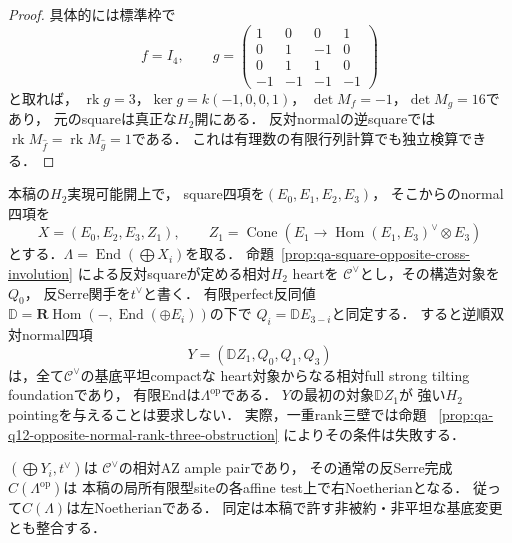 \begin{proof}
具体的には標準枠で
\[
 f=I_4,\qquad
 g=\begin{pmatrix}
 1&0&0&1\\0&1&-1&0\\0&1&1&0\\-1&-1&-1&-1
 \end{pmatrix}
\]
と取れば，
$\operatorname{rk}g=3$，$\ker g=k(-1,0,0,1)$，
$\det M_f=-1$，$\det M_g=16$であり，
元のsquareは真正な$H_2$開にある．
反対normalの逆squareでは
$\operatorname{rk}M_{\widehat f}
=\operatorname{rk}M_{\widehat g}=1$である．
これは有理数の有限行列計算でも独立検算できる．
\end{proof}

\begin{lemma}
\label{lem:qa-q12-opposite-normal-dual-heart-az}
本稿の$H_2$実現可能開上で，
square四項を$(E_0,E_1,E_2,E_3)$，
そこからのnormal四項を
\[
 X=(E_0,E_2,E_3,Z_1),\qquad
 Z_1=\operatorname{Cone}
 (E_1\to\operatorname{Hom}(E_1,E_3)^\vee\otimes E_3)
\]
とする．$\Lambda=\operatorname{End}(\bigoplus X_i)$を取る．
命題~\ref{prop:qa-square-opposite-cross-involution}
による反対squareが定める相対$H_2$ heartを
$\mathcal C^\vee$とし，その構造対象を$Q_0$，
反Serre関手を$t^\vee$と書く．
有限perfect反同値
$\mathbb D=\mathbf R\operatorname{Hom}
(-,\operatorname{End}(\oplus E_i))$の下で
$Q_i=\mathbb D E_{3-i}$と同定する．
すると逆順双対normal四項
\[
 Y=(\mathbb D Z_1,Q_0,Q_1,Q_3)
 \tag{ON}\label{eq:qa-q12-opposite-normal-dual-window}
\]
は，全て$\mathcal C^\vee$の基底平坦compactな
heart対象からなる相対full strong tilting foundationであり，
有限Endは$\Lambda^{\mathrm{op}}$である．
$Y$の最初の対象$\mathbb D Z_1$が
強い$H_2$ pointingを与えることは要求しない．
実際，一重rank三壁では命題~
\ref{prop:qa-q12-opposite-normal-rank-three-obstruction}
によりその条件は失敗する．

$(\bigoplus Y_i,t^\vee)$は
$\mathcal C^\vee$の相対AZ ample pairであり，
その通常の反Serre完成
$C(\Lambda^{\mathrm{op}})$は
本稿の局所有限型siteの各affine test上で右Noetherianとなる．
従って$C(\Lambda)$は左Noetherianである．
同定は本稿で許す非被約・非平坦な基底変更とも整合する．
\end{lemma}
